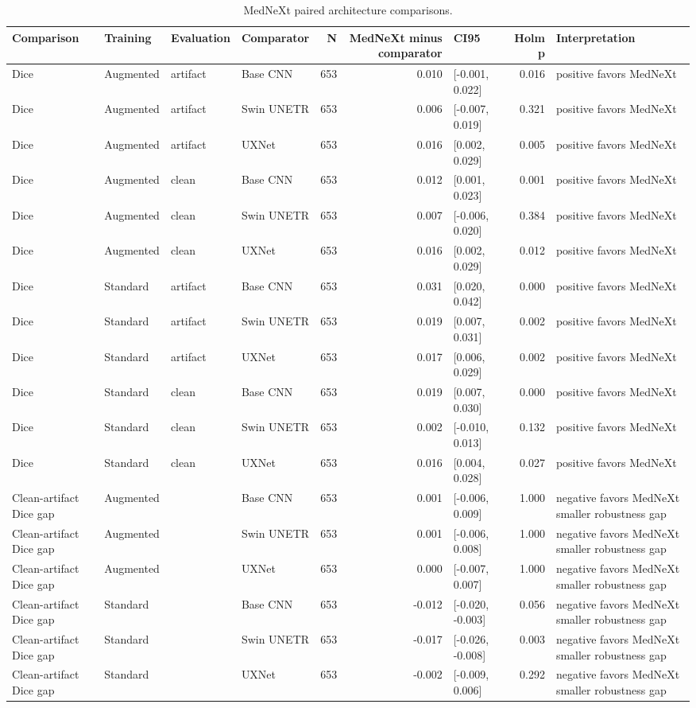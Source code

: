 \begin{table}
\caption{MedNeXt paired architecture comparisons.}
\label{tab:mednext_architecture_comparisons}
\begin{tabular}{llllrrlrl}
\toprule
Comparison & Training & Evaluation & Comparator & N & MedNeXt minus comparator & CI95 & Holm p & Interpretation \\
\midrule
Dice & Augmented & artifact & Base CNN & 653 & 0.010 & [-0.001, 0.022] & 0.016 & positive favors MedNeXt \\
Dice & Augmented & artifact & Swin UNETR & 653 & 0.006 & [-0.007, 0.019] & 0.321 & positive favors MedNeXt \\
Dice & Augmented & artifact & UXNet & 653 & 0.016 & [0.002, 0.029] & 0.005 & positive favors MedNeXt \\
Dice & Augmented & clean & Base CNN & 653 & 0.012 & [0.001, 0.023] & 0.001 & positive favors MedNeXt \\
Dice & Augmented & clean & Swin UNETR & 653 & 0.007 & [-0.006, 0.020] & 0.384 & positive favors MedNeXt \\
Dice & Augmented & clean & UXNet & 653 & 0.016 & [0.002, 0.029] & 0.012 & positive favors MedNeXt \\
Dice & Standard & artifact & Base CNN & 653 & 0.031 & [0.020, 0.042] & 0.000 & positive favors MedNeXt \\
Dice & Standard & artifact & Swin UNETR & 653 & 0.019 & [0.007, 0.031] & 0.002 & positive favors MedNeXt \\
Dice & Standard & artifact & UXNet & 653 & 0.017 & [0.006, 0.029] & 0.002 & positive favors MedNeXt \\
Dice & Standard & clean & Base CNN & 653 & 0.019 & [0.007, 0.030] & 0.000 & positive favors MedNeXt \\
Dice & Standard & clean & Swin UNETR & 653 & 0.002 & [-0.010, 0.013] & 0.132 & positive favors MedNeXt \\
Dice & Standard & clean & UXNet & 653 & 0.016 & [0.004, 0.028] & 0.027 & positive favors MedNeXt \\
Clean-artifact Dice gap & Augmented &  & Base CNN & 653 & 0.001 & [-0.006, 0.009] & 1.000 & negative favors MedNeXt smaller robustness gap \\
Clean-artifact Dice gap & Augmented &  & Swin UNETR & 653 & 0.001 & [-0.006, 0.008] & 1.000 & negative favors MedNeXt smaller robustness gap \\
Clean-artifact Dice gap & Augmented &  & UXNet & 653 & 0.000 & [-0.007, 0.007] & 1.000 & negative favors MedNeXt smaller robustness gap \\
Clean-artifact Dice gap & Standard &  & Base CNN & 653 & -0.012 & [-0.020, -0.003] & 0.056 & negative favors MedNeXt smaller robustness gap \\
Clean-artifact Dice gap & Standard &  & Swin UNETR & 653 & -0.017 & [-0.026, -0.008] & 0.003 & negative favors MedNeXt smaller robustness gap \\
Clean-artifact Dice gap & Standard &  & UXNet & 653 & -0.002 & [-0.009, 0.006] & 0.292 & negative favors MedNeXt smaller robustness gap \\
\bottomrule
\end{tabular}
\end{table}
